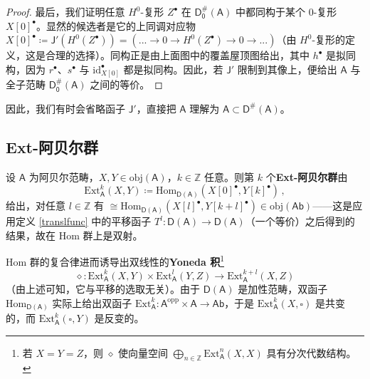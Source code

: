 \begin{proof}
	最后，我们证明任意 $H^0$-复形 $Z^\bullet$ 在 $\mathsf{D_0^\#\!(A)}$ 中都同构于某个 0-复形 $X[0]^\bullet$。显然的候选者是它的上同调对应物 $X[0]^\bullet\coloneqq\mathsf{J}'(H^0(Z^\bullet))=(...\rightarrow 0\rightarrow H^0(Z^\bullet)\rightarrow 0\rightarrow...)$（由 $H^0$-复形的定义，这是合理的选择）。同构正是由上面图中的覆盖屋顶图给出，其中 $h^\bullet$ 是拟同构，因为 $r^\bullet$、$s^\bullet$ 与 $\text{id}_{X[0]}^\bullet$ 都是拟同构。因此，若 $\mathsf{J}'$ 限制到其像上，便给出 $\mathsf{A}$ 与全子范畴 $\mathsf{D_0^\#\!(A)}$ 之间的等价。 
\end{proof}


因此，我们有时会省略函子 $\mathsf{J}'$，直接把 $\mathsf{A}$ 理解为 $\mathsf{A}\subset\mathsf{D^\#\!(A)}$。


\subsection{Ext-阿贝尔群}\label{ch2.6}


\begin{Def}
	设 $\mathsf{A}$ 为阿贝尔范畴，$X, Y\in\text{obj}(\mathsf{A})$，$k\in\mathbb{Z}$ 任意。则第 $k$ 个\textbf{Ext-阿贝尔群}由
	\begin{equation}\label{Extgroup}
		\text{Ext}_\mathsf{A}^k(X,Y)\coloneqq \text{Hom}_{\mathsf{D(A)}}(X[0]^\bullet,Y[k]^\bullet)\,,
	\end{equation}
	给出，对任意 $l\in\mathbb{Z}$ 有 $\cong\text{Hom}_\mathsf{D(A)}(X[l]^\bullet,Y[k+l]^\bullet)\in\text{obj}(\mathsf{Ab})$——这是应用定义 \ref{translfunc} 中的平移函子 $T^l:\mathsf{D(A)}\rightarrow\mathsf{D(A)}$（一个等价）之后得到的结果，故在 Hom 群上是双射。 
	
	Hom 群的复合律进而诱导出双线性的\textbf{Yoneda 积}\footnote{若 $X=Y=Z$，则 $\diamond$ 使向量空间 $\bigoplus_{n\in\mathbb{Z}}\text{Ext}_\mathsf{A}^n(X,X)$ 具有分次代数结构。}
	\begin{equation}
		\diamond:\text{Ext}_\mathsf{A}^k(X,Y)\times\text{Ext}_\mathsf{A}^l(Y,Z)\rightarrow\text{Ext}_\mathsf{A}^{k+l}(X,Z)
	\end{equation}
	（由上述可知，它与平移的选取无关）。由于 $\mathsf{D(A)}$ 是加性范畴，双函子 $\text{Hom}_\mathsf{D(A)}$ 实际上给出双函子 $\text{Ext}_\mathsf{A}^k:\mathsf{A}^\text{opp}\times\mathsf{A}\rightarrow\mathsf{Ab}$，于是 $\text{Ext}_\mathsf{A}^k(X,\square)$ 是共变的，而 $\text{Ext}_\mathsf{A}^k(\square,Y)$ 是反变的。
\end{Def}

